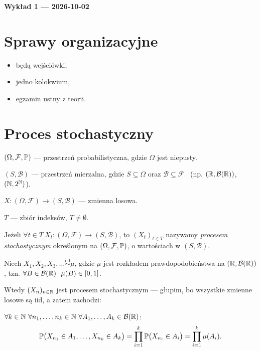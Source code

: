 \documentclass[dvipsnames]{book}
\begin{document}
\begin{center}
  {\Large\bfseries Wykład 1 --- 2026-10-02}
\end{center}

\section*{Sprawy organizacyjne}

\begin{itemize}[topsep=0pt,itemsep=0pt]
  \item będą wejściówki,
  \item jedno kolokwium,
  \item egzamin ustny z teorii.
\end{itemize}

\hrulefill

\section*{Proces stochastyczny}

\begin{definicja}
$(\Omega, \mathcal{F}, \P)$ --- przestrzeń probabilistyczna, gdzie $\Omega$ jest
niepusty.

$(S, \mathcal{B})$ --- przestrzeń mierzalna, gdzie $S \subseteq \Omega$ oraz
$\mathcal{B} \subseteq \mathcal{F}$ \ (np. $(\R, \mathcal{B}(\R))$, $(\N, 2^{\N})$).

$X \colon (\Omega, \mathcal{F}) \to (S, \mathcal{B})$ --- zmienna losowa.

$T$ --- zbiór indeksów, $T \neq \emptyset$.

Jeżeli $\forall t \in T\ X_t \colon (\Omega, \mathcal{F}) \to (S, \mathcal{B})$,
to $(X_t)_{t \in T}$ nazywamy \emph{procesem stochastycznym} określonym na
$(\Omega, \mathcal{F}, \P)$, o wartościach w $(S, \mathcal{B})$.
\end{definicja}

\begin{przyklad}
Niech $X_1, X_2, X_3, \ldots \overset{\text{iid}}{\sim} \mu$, gdzie $\mu$ jest
rozkładem prawdopodobieństwa na $(\R, \mathcal{B}(\R))$, tzn.
$\forall B \in \mathcal{B}(\R)\ \ \mu(B) \in [0,1]$.

Wtedy $(X_n)_{n \in \N}$ jest procesem stochastycznym --- głupim, bo wszystkie
zmienne losowe są iid, a zatem zachodzi:

$\forall k \in \N\ \forall n_1, \ldots, n_k \in \N\
 \forall A_1, \ldots, A_k \in \mathcal{B}(\R)$:
\[
  \P\big(X_{n_1} \in A_1, \ldots, X_{n_k} \in A_k\big)
  = \prod_{i=1}^{k} \P\big(X_{n_i} \in A_i\big)
  = \prod_{i=1}^{k} \mu(A_i).
\]
\end{przyklad}
\end{document}
